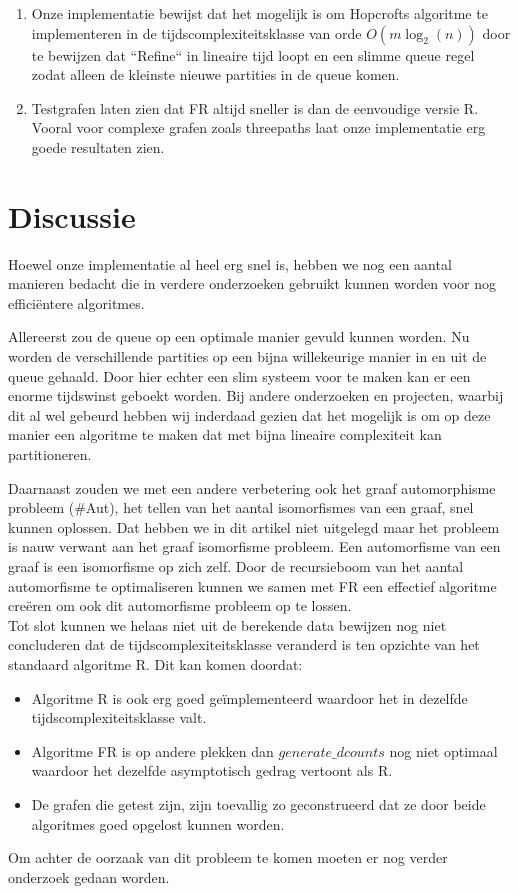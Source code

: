 \documentclass[twoside]{article}
\begin{document}
\begin{multicols}{2}
\begin{enumerate}
\item Onze implementatie bewijst dat het mogelijk is om Hopcrofts algoritme te implementeren in de tijdscomplexiteitsklasse van orde $O(m\log_{2}(n))$ door te bewijzen dat ``Refine`` in lineaire tijd loopt en een slimme queue regel zodat alleen de kleinste nieuwe partities in de queue komen.
\item Testgrafen laten zien dat FR altijd sneller is dan de eenvoudige versie R. Vooral voor complexe grafen zoals threepaths laat onze implementatie erg goede resultaten zien.
\end{enumerate}

\section{Discussie}
Hoewel onze implementatie al heel erg snel is, hebben we nog een aantal manieren bedacht die in verdere onderzoeken gebruikt kunnen worden voor nog effici\"entere algoritmes.

Allereerst zou de queue op een optimale manier gevuld kunnen worden. Nu worden de verschillende partities op een bijna willekeurige manier in en uit de queue gehaald. Door hier echter een slim systeem voor te maken kan er een enorme tijdswinst geboekt worden. Bij andere onderzoeken en projecten, waarbij dit al wel gebeurd hebben wij inderdaad gezien dat het mogelijk is om op deze manier een algoritme te maken dat met bijna lineaire complexiteit kan partitioneren.

Daarnaast zouden we met een andere verbetering ook het graaf automorphisme probleem (#Aut), het tellen van het aantal isomorfismes van een graaf, snel kunnen oplossen. Dat hebben we in dit artikel niet uitgelegd maar het probleem is nauw verwant aan het graaf isomorfisme probleem. Een automorfisme van een graaf is een isomorfisme op zich zelf. Door de recursieboom van het aantal automorfisme te optimaliseren kunnen we samen met FR een effectief algoritme cre\"eren om ook dit automorfisme probleem op te lossen.\cite{slides_aut}\\

Tot slot kunnen we helaas niet uit de berekende data bewijzen nog niet concluderen dat de tijdscomplexiteitsklasse veranderd is ten opzichte van het standaard algoritme R. Dit kan komen doordat:
\begin{itemize}
\item Algoritme R is ook erg goed ge\"implementeerd waardoor het in dezelfde tijdscomplexiteitsklasse valt.
\item Algoritme FR is op andere plekken dan $generate\_dcounts$ nog niet optimaal waardoor het dezelfde asymptotisch gedrag vertoont als R.
\item De grafen die getest zijn, zijn toevallig zo geconstrueerd dat ze door beide algoritmes goed opgelost kunnen worden.
\end{itemize}
Om achter de oorzaak van dit probleem te komen moeten er nog verder onderzoek gedaan worden.



\end{multicols}
\end{document}
